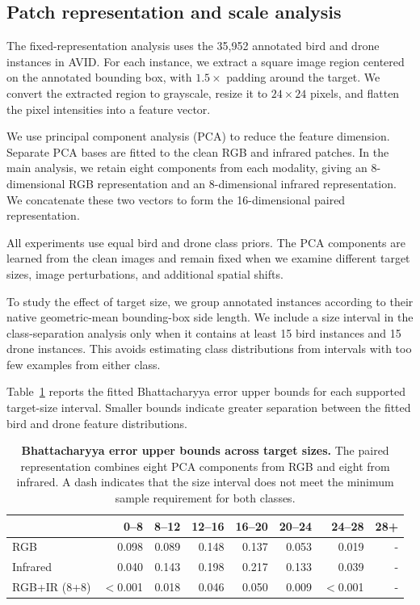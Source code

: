\documentclass[10pt]{article}
\newcommand{\dataset}{\textsc{AVID}}
\begin{document}
\subsection{Patch representation and scale analysis}

The fixed-representation analysis uses the 35,952 annotated bird and drone instances in \dataset{}. For each instance, we extract a square image region centered on the annotated bounding box, with $1.5\times$ padding around the target. We convert the extracted region to grayscale, resize it to $24\times24$ pixels, and flatten the pixel intensities into a feature vector.

We use principal component analysis (PCA) to reduce the feature dimension. Separate PCA bases are fitted to the clean RGB and infrared patches. In the main analysis, we retain eight components from each modality, giving an 8-dimensional RGB representation and an 8-dimensional infrared representation. We concatenate these two vectors to form the 16-dimensional paired representation.

All experiments use equal bird and drone class priors. The PCA components are learned from the clean images and remain fixed when we examine different target sizes, image perturbations, and additional spatial shifts.

To study the effect of target size, we group annotated instances according to their native geometric-mean bounding-box side length. We include a size interval in the class-separation analysis only when it contains at least 15 bird instances and 15 drone instances. This avoids estimating class distributions from intervals with too few examples from either class.

Table~\ref{tab:scalebounds} reports the fitted Bhattacharyya error upper bounds for each supported target-size interval. Smaller bounds indicate greater separation between the fitted bird and drone feature distributions.

\begin{table}[h]
\centering
\caption{\textbf{Bhattacharyya error upper bounds across target sizes.}
The paired representation combines eight PCA components from RGB and eight from infrared. A dash indicates that the size interval does not meet the minimum sample requirement for both classes.}
\label{tab:scalebounds}
\small
\begin{tabular}{lrrrrrrr}
\toprule
& 0--8 & 8--12 & 12--16 & 16--20 & 20--24 & 24--28 & 28+ \\
\midrule
RGB
& 0.098 & 0.089 & 0.148 & 0.137 & 0.053 & 0.019 & - \\
Infrared
& 0.040 & 0.143 & 0.198 & 0.217 & 0.133 & 0.039 & - \\
RGB+IR (8+8)
& $<$0.001 & 0.018 & 0.046 & 0.050 & 0.009 & $<$0.001 & - \\
\bottomrule
\end{tabular}
\end{table}
\end{document}
